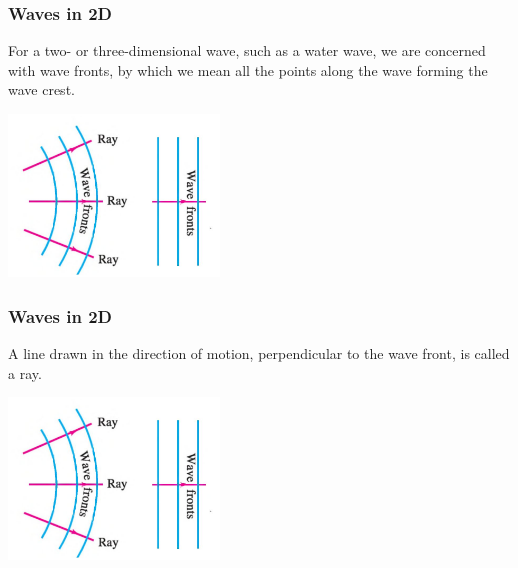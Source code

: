 \documentclass[]{beamer}
\begin{document}
\begin{frame}
  \frametitle{Waves in 2D  }
  
  
  
  
  For a two- or three-dimensional wave, such as a water wave, we are concerned
  with wave fronts, by which we mean all the points along the wave forming the
  wave crest.
  
  
  
    \begin{center}
    \includegraphics[height=1.7in]{images4/13.jpg}
  \end{center}
  
    \end{frame}
  
  
  
  
  
  \begin{frame}
  \frametitle{Waves in 2D }
  
  
  
  
  
  
  A line drawn in the direction of motion, perpendicular to the wave front, is called a ray.
  
  
  
    \begin{center}
    \includegraphics[height=1.7in]{images4/13.jpg}
  \end{center}
  
    \end{frame}
  
  
  
  
\end{document}
